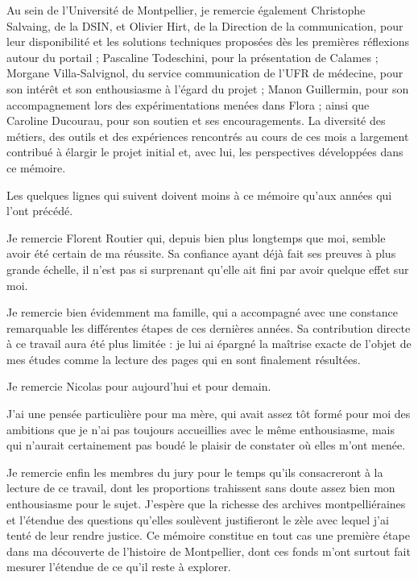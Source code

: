 Au sein de l'Université de Montpellier, je remercie également Christophe Salvaing, de la DSIN, et Olivier Hirt, de la Direction de la communication, pour leur disponibilité et les solutions techniques proposées dès les premières réflexions autour du portail ; Pascaline Todeschini, pour la présentation de Calames ; Morgane Villa-Salvignol, du service communication de l'UFR de médecine, pour son intérêt et son enthousiasme à l'égard du projet ; Manon Guillermin, pour son accompagnement lors des expérimentations menées dans Flora ; ainsi que Caroline Ducourau, pour son soutien et ses encouragements. La diversité des métiers, des outils et des expériences rencontrés au cours de ces mois a largement contribué à élargir le projet initial et, avec lui, les perspectives développées dans ce mémoire.

Les quelques lignes qui suivent doivent moins à ce mémoire qu'aux années qui l'ont précédé.

Je remercie Florent Routier qui, depuis bien plus longtemps que moi, semble avoir été certain de ma réussite. Sa confiance ayant déjà fait ses preuves à plus grande échelle, il n'est pas si surprenant qu'elle ait fini par avoir quelque effet sur moi.

Je remercie bien évidemment ma famille, qui a accompagné avec une constance remarquable les différentes étapes de ces dernières années. Sa contribution directe à ce travail aura été plus limitée : je lui ai épargné la maîtrise exacte de l'objet de mes études comme la lecture des pages qui en sont finalement résultées.

Je remercie Nicolas pour aujourd'hui et pour demain.

J'ai une pensée particulière pour ma mère, qui avait assez tôt formé pour moi des ambitions que je n'ai pas toujours accueillies avec le même enthousiasme, mais qui n'aurait certainement pas boudé le plaisir de constater où elles m'ont menée.

Je remercie enfin les membres du jury pour le temps qu'ils consacreront à la lecture de ce travail, dont les proportions trahissent sans doute assez bien mon enthousiasme pour le sujet. J'espère que la richesse des archives montpelliéraines et l'étendue des questions qu'elles soulèvent justifieront le zèle avec lequel j'ai tenté de leur rendre justice. Ce mémoire constitue en tout cas une première étape dans ma découverte de l'histoire de Montpellier, dont ces fonds m'ont surtout fait mesurer l'étendue de ce qu'il reste à explorer.